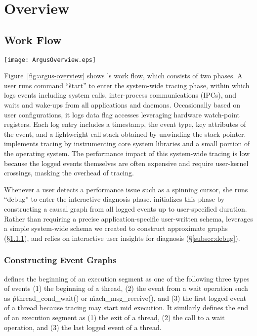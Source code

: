 \section{Overview} \label{sec:overview}

\subsection{\xxx Work Flow}

\begin{figure*}[tb]
    \centering
    \texttt{[image: ArgusOverview.eps]}
    \caption{\xxx Work Flow}
    \label{fig:argus-overview}
\end{figure*}

Figure~\ref{fig:argus-overview} shows \xxx's work flow, which consists of two
phases.  A user runs command ``\v{\xxx start}'' to enter the system-wide
tracing phase, within which \xxx logs events including system calls,
inter-process communications (IPCs), and waits and wake-ups from all
applications and daemons.  Occasionally based on user configurations, it logs
data flag accesses leveraging hardware watch-point registers.  Each log entry
includes a timestamp, the event type, key attributes of the event, and a
lightweight call stack obtained by unwinding the stack pointer.  \xxx
implements tracing by instrumenting core system libraries and a small portion
of the operating system.  The performance impact of this system-wide tracing is
low because the logged events themselves are often expensive and require
user-kernel crossings, masking the overhead of tracing.

Whenever a user detects a performance issue such as a spinning cursor, she runs
``\v{\xxx debug}'' to enter the interactive diagnosis phase.  \xxx initializes
this phase by constructing a causal graph from all logged events up to
user-specified duration.  Rather than requiring a precise application-specific
user-written schema, \xxx leverages a simple system-wide schema we created to
construct approximate graphs (\S\ref{subsec:graph}), and relies on interactive
user insights for diagnosis (\S\ref{subsec:debug}).

\subsubsection{Constructing Event Graphs} \label{subsec:graph}

\xxx defines the beginning of an execution segment as one of the following
three types of events (1) the beginning of a thread, (2) the event from a wait
operation such as \v{pthread\_cond\_wait()} or \v{mach\_msg\_receive()}, and
(3) the first logged event of a thread because tracing may start mid execution.
It similarly defines the end of an execution segment as (1) the exit of a
thread, (2) the call to a wait operation, and (3) the last logged event of a
thread.

